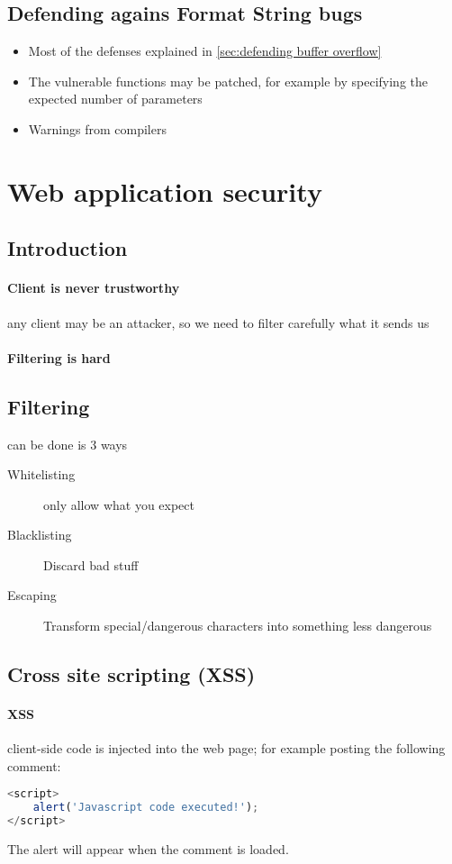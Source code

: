 \documentclass{article}
\begin{document}
\subsection{Defending agains Format String bugs}
\begin{itemize}
\item Most of the defenses explained in \ref{sec:defending buffer overflow}
\item The vulnerable functions may be patched, for example by specifying the expected number of parameters
\item Warnings from compilers
\end{itemize}

\section{Web application security}
\subsection{Introduction}
\paragraph{Client is never trustworthy} any client may be an attacker, so we need to filter carefully what it sends us
\paragraph{Filtering is hard} 
\subsection{Filtering} can be done is 3 ways
\begin{description}
\item[Whitelisting] only allow what you expect
\item[Blacklisting] Discard bad stuff
\item[Escaping] Transform special/dangerous characters into something less dangerous
\end{description}
\subsection{Cross site scripting (XSS)}
\paragraph{XSS} client-side code is injected into the web page; for example posting the following comment:
\begin{lstlisting}[language=JavaScript]
<script>
	alert('Javascript code executed!');
</script>
\end{lstlisting}
The alert will appear when the comment is loaded.
\end{document}
